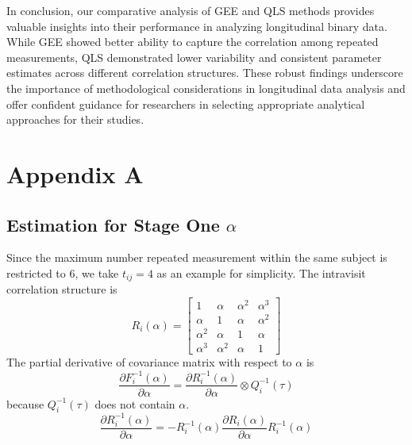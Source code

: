 \documentclass[
]{aft}
\begin{document}
In conclusion, our comparative analysis of GEE and QLS methods provides
valuable insights into their performance in analyzing longitudinal
binary data. While GEE showed better ability to capture the correlation
among repeated measurements, QLS demonstrated lower variability and
consistent parameter estimates across different correlation structures.
These robust findings underscore the importance of methodological
considerations in longitudinal data analysis and offer confident
guidance for researchers in selecting appropriate analytical approaches
for their studies.

\newpage

\section{Appendix A}\label{appendix-a}

\subsection{\texorpdfstring{Estimation for Stage One
\(\alpha\)}{Estimation for Stage One \textbackslash alpha}}\label{estimation-for-stage-one-alpha}

Since the maximum number repeated measurement within the same subject is
restricted to 6, we take \(t_{ij} = 4\) as an example for simplicity.
The intravisit correlation structure is \[
R_i(\alpha) = 
\begin{bmatrix}
1 & \alpha & \alpha^2 & \alpha^3\\
\alpha & 1 & \alpha & \alpha^2\\
\alpha^2 & \alpha & 1 & \alpha\\
\alpha^3 & \alpha^2 & \alpha & 1
\end{bmatrix}
\] The partial derivative of covariance matrix with respect to
\(\alpha\) is \[
\frac{\partial F_i^{-1}(\alpha)}{\partial \alpha} = \frac{\partial{R_i^{-1}(\alpha)}}{\partial \alpha} \otimes Q_i^{-1}(\tau)
\] because \(Q^{-1}_i(\tau)\) does not contain \(\alpha\). \[
\frac{\partial{R_i^{-1}(\alpha)}}{\partial \alpha} = -R_i^{-1}(\alpha) \frac{\partial R_i(\alpha)}{\partial \alpha} R_i^{-1}(\alpha)
\]
\end{document}
